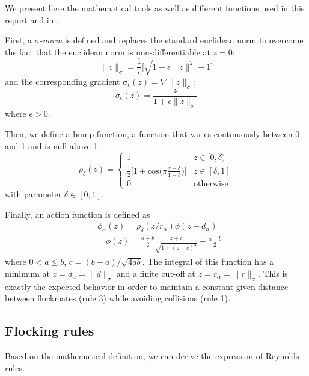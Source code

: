 We present here the mathematical tools as well as different functions used in this report and in \cite{olfati-saber_flocking_2006}. 

First, a $\sigma$\emph{-norm} is defined and replaces the standard euclidean norm to overcome the fact that the euclidean norm is non-differentiable at $z=0$:
\begin{equation}
\|z\|_{\sigma}=\frac{1}{\epsilon}\big[\sqrt{1+\epsilon\|z\|^2}-1\big]
\label{eq:sigmanorm}
\end{equation}
and the corresponding gradient $\sigma_{\epsilon}(z)=\nabla\|z\|_{\sigma}$:
\begin{equation}
\sigma_{\epsilon}(z)=\frac{z}{1+\epsilon\|z\|_{\sigma}}
\label{eq:sigmagrad}
\end{equation}
where $\epsilon>0$. 

Then, we define a bump function, a function that varies continuously between 0 and 1 and is null above 1:
\begin{equation}
\rho_{\delta}(z)=
\left\lbrace
\begin{array}{lll}
1 & z\in[0,\delta)\\
\frac{1}{2}\Big[1+\text{cos}\big(\pi\frac{z-\delta}{1-\delta}\big)\Big] & z\in[\delta,1]\\
0 & \mbox{otherwise}
\end{array}\right.
\label{eq:bump}
\end{equation}
with parameter $\delta\in[0,1]$.

Finally, an action function is defined as 
\begin{align}
&\phi_{\alpha}(z)=\rho_{\delta}(z/r_{\alpha})\phi(z-d_{\alpha}) \nonumber \\
&\quad\phi(z)=\frac{a+b}{2}\frac{z+c}{\sqrt{1+(z+c)^2}}+\frac{a-b}{2}
\label{eq:phi}
\end{align}
where $0<a\le b$, $c=(b-a)/\sqrt{4ab}$. The integral of this function has a minimum at $z=d_{\alpha}=\|d\|_{\sigma}$ and a finite cut-off at $z=r_{\alpha}=\|r\|_{\sigma}$. This is exactly the expected behavior in order to maintain a constant given distance between flockmates (rule 3) while avoiding collisions (rule 1). 

\subsection{Flocking rules}

Based on the mathematical definition, we can derive the expression of Reynolds rules. 

